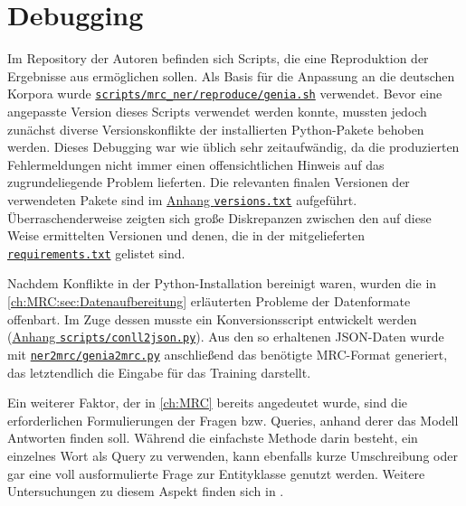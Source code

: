 \section{Debugging}
\label{ch:Training:sec:Debugging}

Im Repository der Autoren befinden sich Scripts, die eine Reproduktion der Ergebnisse aus \textcite{li2019unified} ermöglichen sollen. Als Basis für die Anpassung an die deutschen Korpora wurde \href{https://github.com/ShannonAI/mrc-for-flat-nested-ner/blob/457b0759f7fd462d0abd0a23441726352716fff9/scripts/mrc_ner/reproduce/genia.sh}{\texttt{scripts/mrc\_ner/reproduce/genia.sh}} verwendet. Bevor eine angepasste Version dieses Scripts verwendet werden konnte, mussten jedoch zunächst diverse Versionskonflikte der installierten Python-Pakete behoben werden. Dieses Debugging war wie üblich sehr zeitaufwändig, da die produzierten Fehlermeldungen nicht immer einen offensichtlichen Hinweis auf das zugrundeliegende Problem lieferten. Die relevanten finalen Versionen der verwendeten Pakete sind im \hyperref[app:versions]{Anhang \texttt{versions.txt}} aufgeführt. Überraschenderweise zeigten sich große Diskrepanzen zwischen den auf diese Weise ermittelten Versionen und denen, die in der mitgelieferten \href{https://github.com/ShannonAI/mrc-for-flat-nested-ner/blob/457b0759f7fd462d0abd0a23441726352716fff9/requirements.txt}{\texttt{requirements.txt}} gelistet sind.

Nachdem Konflikte in der Python-Installation bereinigt waren, wurden die in \autoref{ch:MRC:sec:Datenaufbereitung} erläuterten Probleme der Datenformate offenbart. Im Zuge dessen musste ein Konversionsscript entwickelt werden (\hyperref[app:conll2json]{Anhang \texttt{scripts/conll2json.py}}). Aus den so erhaltenen JSON-Daten wurde mit \href{https://github.com/ShannonAI/mrc-for-flat-nested-ner/blob/457b0759f7fd462d0abd0a23441726352716fff9/ner2mrc/genia2mrc.py}{\texttt{ner2mrc/genia2mrc.py}} anschließend das benötigte MRC-Format generiert, das letztendlich die Eingabe für das Training darstellt.

Ein weiterer Faktor, der in \autoref{ch:MRC} bereits angedeutet wurde, sind die erforderlichen Formulierungen der Fragen bzw. Queries, anhand derer das Modell Antworten finden soll. Während die einfachste Methode darin besteht, ein einzelnes Wort als Query zu verwenden, kann ebenfalls kurze Umschreibung oder gar eine voll ausformulierte Frage zur Entityklasse genutzt werden. Weitere Untersuchungen zu diesem Aspekt finden sich in \textcite{li2019unified}.

